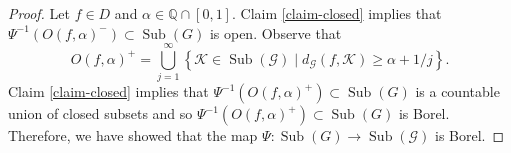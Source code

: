 \documentclass[10pt,a4paper]{amsart}
\newcommand{\Sub}{\operatorname{Sub}}
\begin{document}
\begin{proof}
Let $f \in D$ and $\alpha \in \mathbb Q \cap [0, 1]$. Claim \ref{claim-closed} implies that $\Psi^{-1}(O(f, \alpha)^-) \subset \Sub(G)$ is open. Observe that 
$$O(f, \alpha)^+ = \bigcup_{j = 1}^\infty  \left \{\mathscr K \in \Sub(\mathscr G) \mid d_{\mathscr G}(f, \mathscr K) \geq \alpha + 1/j \right \}.$$
Claim \ref{claim-closed} implies that $\Psi^{-1}(O(f, \alpha)^+) \subset \Sub(G)$ is a countable union of closed subsets and so $\Psi^{-1}(O(f, \alpha)^+) \subset \Sub(G)$ is Borel. Therefore, we have showed that the map $\Psi : \Sub(G) \to \Sub(\mathscr G) $ is Borel.
\end{proof}
\end{document}
